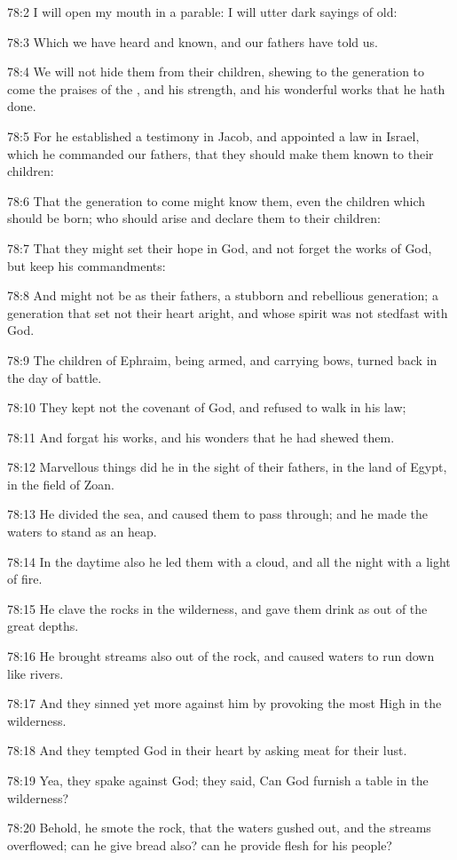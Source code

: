 78:2 I will open my mouth in a parable: I will utter dark sayings of old:

78:3 Which we have heard and known, and our fathers have told us.

78:4 We will not hide them from their children, shewing to the generation to come the praises of the \LORD, and his strength, and his wonderful works that he hath done.

78:5 For he established a testimony in Jacob, and appointed a law in Israel, which he commanded our fathers, that they should make them known to their children:

78:6 That the generation to come might know them, even the children which should be born; who should arise and declare them to their children:

78:7 That they might set their hope in God, and not forget the works of God, but keep his commandments:

78:8 And might not be as their fathers, a stubborn and rebellious generation; a generation that set not their heart aright, and whose spirit was not stedfast with God.

78:9 The children of Ephraim, being armed, and carrying bows, turned back in the day of battle.

78:10 They kept not the covenant of God, and refused to walk in his law;

78:11 And forgat his works, and his wonders that he had shewed them.

78:12 Marvellous things did he in the sight of their fathers, in the land of Egypt, in the field of Zoan.

78:13 He divided the sea, and caused them to pass through; and he made the waters to stand as an heap.

78:14 In the daytime also he led them with a cloud, and all the night with a light of fire.

78:15 He clave the rocks in the wilderness, and gave them drink as out of the great depths.

78:16 He brought streams also out of the rock, and caused waters to run down like rivers.

78:17 And they sinned yet more against him by provoking the most High in the wilderness.

78:18 And they tempted God in their heart by asking meat for their lust.

78:19 Yea, they spake against God; they said, Can God furnish a table in the wilderness?

78:20 Behold, he smote the rock, that the waters gushed out, and the streams overflowed; can he give bread also? can he provide flesh for his people?

